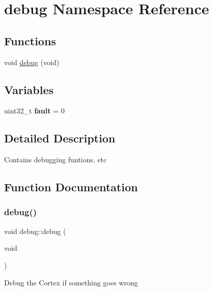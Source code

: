 \hypertarget{namespacedebug}{}\section{debug Namespace Reference}
\label{namespacedebug}
\subsection*{Functions}
\begin{DoxyCompactItemize}
\item 
void \hyperlink{namespacedebug_a1b083c25ffa805221c19f97c56351855}{debug} (void)
\end{DoxyCompactItemize}
\subsection*{Variables}
\begin{DoxyCompactItemize}
\item 
\mbox{\label{namespacedebug_a507b3f8f70ba072d22b18ab9c8e074f4}} 
uint32\+\_\+t {\bfseries fault} = 0
\end{DoxyCompactItemize}


\subsection{Detailed Description}
Contains debugging funtions, etc 

\subsection{Function Documentation}
\mbox{\label{namespacedebug_a1b083c25ffa805221c19f97c56351855}} 
\subsubsection{\texorpdfstring{debug()}{debug()}}
{\footnotesize\ttfamily void debug\+::debug (\begin{DoxyParamCaption}\item[{void}]{ }\end{DoxyParamCaption})}

Debug the Cortex if something goes wrong 